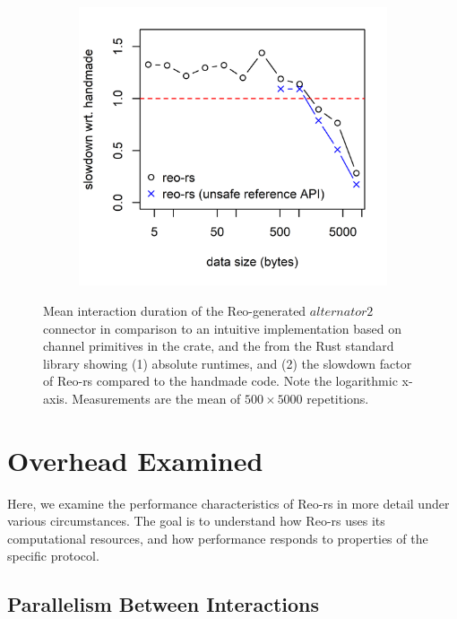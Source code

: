 \begin{figure}
{\begin{subfigure}[b]{0.63\textwidth}
			\includegraphics[width=\textwidth]{experiments/alternator_1.png}
			\caption{}
			\label{fig:alternator2_runtime_1}
		\end{subfigure}%
	}
	\caption[Handcrafted vs.\ Reo-generated alternator.]{Mean interaction duration of the Reo-generated $alternator2$ connector in comparison to an intuitive implementation based on channel primitives in the  crate, and the  from the Rust standard library showing (1) absolute runtimes, and (2) the slowdown factor of Reo-rs compared to the handmade code. Note the logarithmic x-axis. Measurements are the mean of $500\times{}5000$ repetitions.}
	\label{fig:alternator}
	\label{fig:alternator2_runtime}
\end{figure}

\section{Overhead Examined}
\label{sec:overhead_examined}
Here, we examine the performance characteristics of Reo-rs in more detail under various circumstances. The goal is to understand how Reo-rs uses its computational resources, and how performance responds to properties of the specific protocol.

\subsection{Parallelism Between Interactions}


